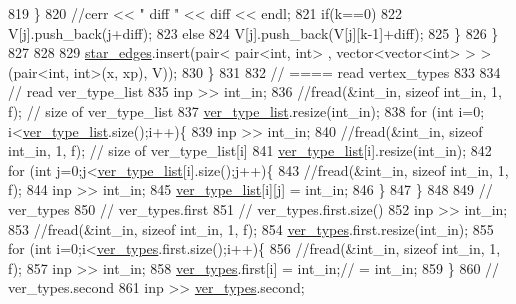 \begin{DoxyCode}
819         \}
820         \textcolor{comment}{//cerr << " diff " << diff << endl;}
821         \textcolor{keywordflow}{if}(k==0)
822           V[j].push\_back(j+diff);
823         \textcolor{keywordflow}{else}
824           V[j].push\_back(V[j][k-1]+diff);
825       \}
826     \}
827 
828 
829     \hyperlink{classmarked__graph__compressed_a7df5779d313486644132bd816937f532}{star\_edges}.insert(pair< pair<int, int> , vector<vector<int> > > (pair<int, int>(x, xp), V));
830   \}
831 
832   \textcolor{comment}{// ==== read vertex\_types}
833 
834   \textcolor{comment}{// read ver\_type\_list}
835   inp >> int\_in;
836   \textcolor{comment}{//fread(&int\_in, sizeof int\_in, 1, f); // size of ver\_type\_list}
837   \hyperlink{classmarked__graph__compressed_af2e3e55223d436628a02758dfae88493}{ver\_type\_list}.resize(int\_in);
838   \textcolor{keywordflow}{for} (\textcolor{keywordtype}{int} i=0; i<\hyperlink{classmarked__graph__compressed_af2e3e55223d436628a02758dfae88493}{ver\_type\_list}.size();i++)\{
839     inp >> int\_in;
840     \textcolor{comment}{//fread(&int\_in, sizeof int\_in, 1, f); // size of ver\_type\_list[i]}
841     \hyperlink{classmarked__graph__compressed_af2e3e55223d436628a02758dfae88493}{ver\_type\_list}[i].resize(int\_in);
842     \textcolor{keywordflow}{for} (\textcolor{keywordtype}{int} j=0;j<\hyperlink{classmarked__graph__compressed_af2e3e55223d436628a02758dfae88493}{ver\_type\_list}[i].size();j++)\{
843       \textcolor{comment}{//fread(&int\_in, sizeof int\_in, 1, f);}
844       inp >> int\_in;
845       \hyperlink{classmarked__graph__compressed_af2e3e55223d436628a02758dfae88493}{ver\_type\_list}[i][j] = int\_in;
846     \}
847   \}
848 
849   \textcolor{comment}{// ver\_types}
850   \textcolor{comment}{// ver\_types.first}
851   \textcolor{comment}{// ver\_types.first.size()}
852   inp >> int\_in;
853   \textcolor{comment}{//fread(&int\_in, sizeof int\_in, 1, f);}
854   \hyperlink{classmarked__graph__compressed_af446cc5e23c241a92b76642fd5ebc403}{ver\_types}.first.resize(int\_in);
855   \textcolor{keywordflow}{for} (\textcolor{keywordtype}{int} i=0;i<\hyperlink{classmarked__graph__compressed_af446cc5e23c241a92b76642fd5ebc403}{ver\_types}.first.size();i++)\{
856     \textcolor{comment}{//fread(&int\_in, sizeof int\_in, 1, f);}
857     inp >> int\_in;
858     \hyperlink{classmarked__graph__compressed_af446cc5e23c241a92b76642fd5ebc403}{ver\_types}.first[i] = int\_in;\textcolor{comment}{// = int\_in;}
859   \}
860   \textcolor{comment}{// ver\_types.second}
861   inp >> \hyperlink{classmarked__graph__compressed_af446cc5e23c241a92b76642fd5ebc403}{ver\_types}.second;

\end{DoxyCode}
